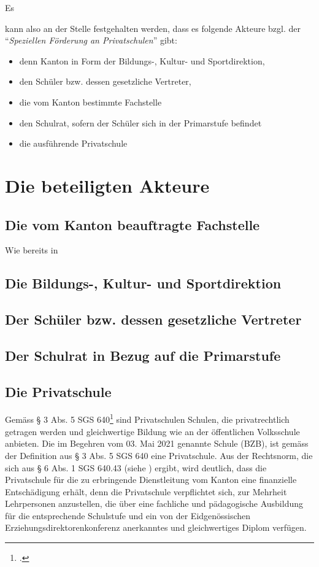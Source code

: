 \documentclass[10pt,parskip]{scrbook}
\newcounter{rz}
\newcommand{\Rz}{\addtocounter{rz}{1}\marginpar{\texttt{\textit{A\arabic{rz}}}}}
\newcommand{\RzLabel}[1]{\refstepcounter{rz}\label{#1}\marginpar{\texttt{\textit{A\arabic{rz}}}}}
\begin{document}
Es \Rz kann also an der Stelle festgehalten werden, dass es folgende Akteure bzgl. der "`\textsl{Speziellen Förderung an Privatschulen}"' gibt:
\begin{itemize}[noitemsep]\setlength\itemsep{0.3em}
	\item denn Kanton in Form der Bildungs-, Kultur- und Sportdirektion,
	\item den Schüler bzw. dessen gesetzliche Vertreter,
	\item die vom Kanton bestimmte Fachstelle
	\item den Schulrat, sofern der Schüler sich in der Primarstufe befindet
	\item die ausführende Privatschule
\end{itemize} 



\chapter{Die beteiligten Akteure}

\section{Die vom Kanton beauftragte Fachstelle}
Wie bereits in 

\section{Die Bildungs-, Kultur- und Sportdirektion}

\section{Der Schüler bzw. dessen gesetzliche Vertreter}



\section{Der Schulrat in Bezug auf die Primarstufe}

\section{Die Privatschule}

Gemäss \RzLabel{DefPS} § 3 Abs. 5 SGS 640\footcite{SGS640} sind Privatschulen Schulen, die privatrechtlich getragen werden und gleichwertige Bildung wie an der öffentlichen Volksschule anbieten. Die im Begehren vom 03. Mai 2021 genannte Schule (BZB), ist gemäss der Definition aus § 3 Abs. 5 SGS 640 eine Privatschule. Aus der Rechtsnorm, die sich aus § 6  Abs. 1 SGS 640.43 (siehe \cite{SGS64043}) ergibt, wird deutlich, dass die Privatschule für die zu erbringende Dienstleitung vom Kanton eine finanzielle Entschädigung erhält, denn die Privatschule verpflichtet sich, zur Mehrheit Lehrpersonen anzustellen, die über eine fachliche und pädagogische Ausbildung für die entsprechende Schulstufe und ein von der Eidgenössischen Erziehungsdirektorenkonferenz anerkanntes und gleichwertiges Diplom verfügen.
\end{document}
